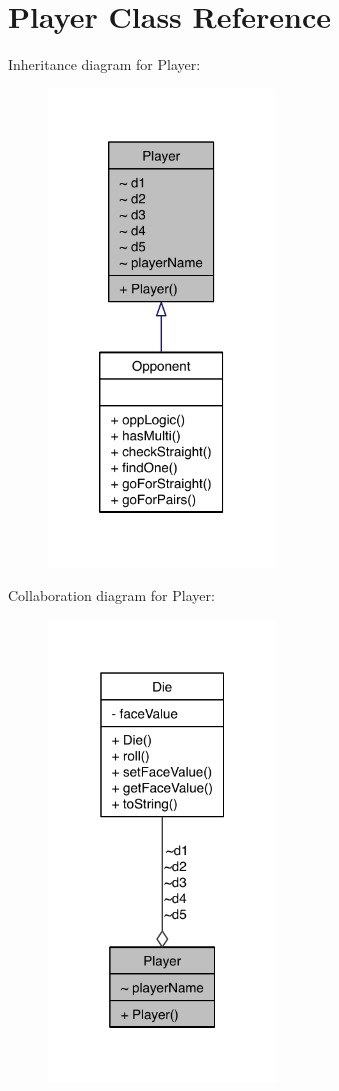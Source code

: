 \hypertarget{class_player}{\section{Player Class Reference}
\label{class_player}
}


Inheritance diagram for Player\-:\nopagebreak
\begin{figure}[H]
\begin{center}
\leavevmode
\includegraphics[width=170pt]{class_player__inherit__graph}
\end{center}
\end{figure}


Collaboration diagram for Player\-:\nopagebreak
\begin{figure}[H]
\begin{center}
\leavevmode
\includegraphics[width=172pt]{class_player__coll__graph}
\end{center}
\end{figure}
